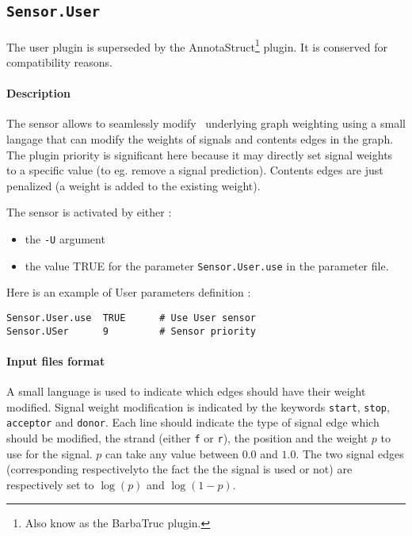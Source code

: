 
\subsection{\texttt{Sensor.User}}
\label{pluguser}

The user plugin is superseded by the AnnotaStruct\footnote{Also know
  as the BarbaTruc plugin.} plugin. It is conserved for compatibility
reasons.

\paragraph{Description}

The sensor allows to seamlessly modify \EuGene\ underlying graph
weighting using a small langage that can modify the weights of signals
and contents edges in the graph. The plugin priority is significant
here because it may directly set signal weights to a specific value
(to eg. remove a signal prediction). Contents edges are just penalized
(a weight is added to the existing weight).

The sensor is activated by either :
\begin{itemize}
\item the \texttt{-U} argument 
\item the value TRUE for the parameter \texttt{Sensor.User.use} in the
  parameter file.
\end{itemize}
Here is an example of User parameters definition :
\begin{Verbatim}[fontsize=\small]
Sensor.User.use  TRUE      # Use User sensor
Sensor.USer      9         # Sensor priority
\end{Verbatim}

\paragraph{Input files format}

A small language is used to indicate which edges should have their
weight modified. Signal weight modification is indicated by the
keywords \texttt{start}, \texttt{stop}, \texttt{acceptor} and
\texttt{donor}. Each line should indicate the type of signal edge
which should be modified, the strand (either \texttt{f} or
\texttt{r}), the position and the weight $p$ to use for the signal.
$p$ can take any value between $0.0$ and $1.0$. The two signal edges
(corresponding respectivelyto the fact the the signal is used or not)
are respectively set to $\log(p)$ and $\log(1-p)$.


